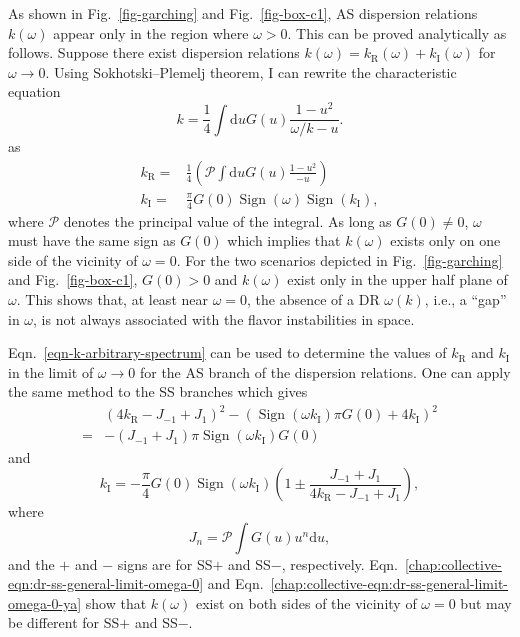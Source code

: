 As shown in Fig.~\ref{fig-garching} and Fig.~\ref{fig-box-c1}, AS dispersion relations $k(\omega)$ appear only in the region where $\omega > 0$. This can be proved analytically as follows.
Suppose there exist dispersion relations $k(\omega) = k_{\mathrm R}(\omega) + k_{\mathrm I}(\omega)$ for $\omega \to 0$. Using Sokhotski–Plemelj theorem, I can rewrite the characteristic equation
\begin{equation}
   k = \frac{1}{4} \int \mathrm du G(u) \frac{ 1 - u^2 }{ \omega/k - u }.
   \label{chap:collective-eqn:k-omega-relation}
\end{equation}
as
\begin{subequations}
\begin{align}
k_{\mathrm R} =& \frac{1}{4}\left(  \mathcal{P} \int \mathrm d u G(u) \frac{ 1 - u^2 }{ - u }  \right)\label{eqn-re-k-arbitrary-spectrum} \\
k_{\mathrm I} =&  \frac{\pi}{4}G(0) \operatorname{Sign}\left( \omega \right) \operatorname{Sign}\left(  k_{\mathrm I}  \right),
\label{eqn-im-k-arbitrary-spectrum}
\end{align}
\label{eqn-k-arbitrary-spectrum}
\end{subequations}
where $\mathcal P$ denotes the principal value of the integral. As long as $G(0)\neq 0$, $\omega$ must have the same sign as $G(0)$ which implies that $k(\omega)$ exists only on one side of the vicinity of $\omega=0$. For the two scenarios depicted in Fig.~\ref{fig-garching} and Fig.~\ref{fig-box-c1}, $G(0)>0$ and $k(\omega)$ exist only in the upper half plane of $\omega$. This shows that, at least near $\omega =0$, the absence of a DR $\omega(k)$, i.e., a ``gap'' in $\omega$, is not always associated with the flavor instabilities in space.

Eqn.~\eqref{eqn-k-arbitrary-spectrum} can be used to determine the values of $k_{\mathrm R}$ and $k_{\mathrm I}$ in the limit of $\omega\to 0$ for the AS branch of the dispersion relations. One can apply the same method to the SS branches which gives
\begin{align}
&\left(4 k_{\mathrm R} - J_{-1} + J_1 \right)^2  - \left( \operatorname{Sign}(\omega k_{\mathrm I} )\pi G(0) +4 k_{\mathrm I} \right)^2 \nonumber\\
=& - \left( J_{-1} + J_1 \right) \pi \operatorname{Sign}(\omega k_{\mathrm I} ) G(0)
\label{chap:collective-eqn:dr-ss-general-limit-omega-0}
\end{align}
and
\begin{equation}
   k_{\mathrm I} = - \frac{\pi}{4} G(0) \operatorname{Sign}(\omega k_{\mathrm I} ) \left(  1 \pm \frac{ J_{-1} +  J_1 }{ 4 k_{\mathrm R} - J_{-1} + J_1}  \right),
   \label{chap:collective-eqn:dr-ss-general-limit-omega-0-ya}
\end{equation}
where
\begin{equation}
J_{n} = \mathcal P \int G(u)u^n \mathrm du,
\end{equation}
and the $+$ and $-$ signs are for SS$+$ and SS$-$, respectively. Eqn.~\eqref{chap:collective-eqn:dr-ss-general-limit-omega-0} and Eqn.~\eqref{chap:collective-eqn:dr-ss-general-limit-omega-0-ya} show that $k(\omega)$ exist on both sides of the vicinity of $\omega=0$ but may be different for SS$+$ and SS$-$.


